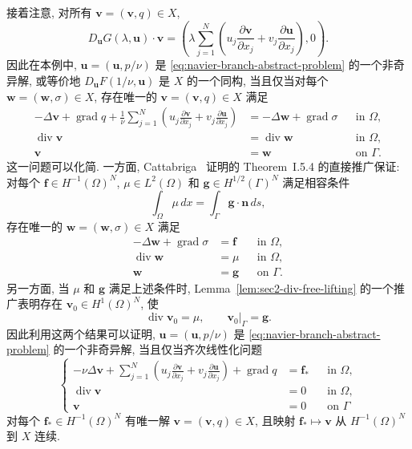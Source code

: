 接着注意, 对所有 $\boldsymbol v=(\mathbf v,q)\in X$,
\[
D_{\boldsymbol u}G(\lambda,\boldsymbol u)\cdot\boldsymbol v
=\left(
\lambda\sum_{j=1}^{N}\left(
u_j\frac{\partial\mathbf v}{\partial x_j}
+v_j\frac{\partial\mathbf u}{\partial x_j}\right),0
\right).
\]
因此在本例中, $\boldsymbol u=(\mathbf u,p/\nu)$ 是
\eqref{eq:navier-branch-abstract-problem} 的一个非奇异解, 或等价地
$D_{\boldsymbol u}F(1/\nu,\boldsymbol u)$ 是 $X$ 的一个同构, 当且仅当对每个
$\boldsymbol w=(\mathbf w,\sigma)\in X$, 存在唯一的
$\boldsymbol v=(\mathbf v,q)\in X$ 满足
\[
\begin{aligned}
-\Delta\mathbf v+\operatorname{grad}q
+\frac1\nu\sum_{j=1}^{N}\left(
u_j\frac{\partial\mathbf v}{\partial x_j}
+v_j\frac{\partial\mathbf u}{\partial x_j}\right)
&=-\Delta\mathbf w+\operatorname{grad}\sigma&&\text{in }\Omega,\\
\operatorname{div}\mathbf v&=\operatorname{div}\mathbf w&&\text{in }\Omega,\\
\mathbf v&=\mathbf w&&\text{on }\Gamma.
\end{aligned}
\]
这一问题可以化简. 一方面, Cattabriga~\cite{Cattabriga1961} 证明的
Theorem~I.5.4 的直接推广保证: 对每个
$\mathbf f\in H^{-1}(\Omega)^N$, $\mu\in L^2(\Omega)$ 和
$\mathbf g\in H^{1/2}(\Gamma)^N$ 满足相容条件
\[
\int_\Omega\mu\,dx=\int_\Gamma\mathbf g\cdot\mathbf n\,ds,
\]
存在唯一的 $\boldsymbol w=(\mathbf w,\sigma)\in X$ 满足
\[
\begin{aligned}
-\Delta\mathbf w+\operatorname{grad}\sigma&=\mathbf f&&\text{in }\Omega,\\
\operatorname{div}\mathbf w&=\mu&&\text{in }\Omega,\\
\mathbf w&=\mathbf g&&\text{on }\Gamma.
\end{aligned}
\]
另一方面, 当 $\mu$ 和 $\mathbf g$ 满足上述条件时,
Lemma~\ref{lem:sec2-div-free-lifting} 的一个推广表明存在
$\mathbf v_0\in H^1(\Omega)^N$, 使
\[
\operatorname{div}\mathbf v_0=\mu,
\qquad
\mathbf v_0|_\Gamma=\mathbf g.
\]
因此利用这两个结果可以证明, $\boldsymbol u=(\mathbf u,p/\nu)$ 是
\eqref{eq:navier-branch-abstract-problem} 的一个非奇异解, 当且仅当齐次线性化问题
\begin{equation}\label{eq:navier-branch-linearized-problem}
\left\{
\begin{aligned}
-\nu\Delta\mathbf v
+\sum_{j=1}^{N}\left(
u_j\frac{\partial\mathbf v}{\partial x_j}
+v_j\frac{\partial\mathbf u}{\partial x_j}\right)
+\operatorname{grad}q&=\mathbf f_*&&\text{in }\Omega,\\
\operatorname{div}\mathbf v&=0&&\text{in }\Omega,\\
\mathbf v&=0&&\text{on }\Gamma
\end{aligned}
\right.
\end{equation}
对每个 $\mathbf f_*\in H^{-1}(\Omega)^N$ 有唯一解
$\boldsymbol v=(\mathbf v,q)\in X$, 且映射
$\mathbf f_*\mapsto\boldsymbol v$ 从 $H^{-1}(\Omega)^N$ 到 $X$ 连续.

